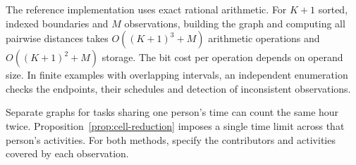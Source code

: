 The reference implementation uses exact rational arithmetic. For $K+1$ sorted, indexed boundaries and $M$ observations, building the graph and computing all pairwise distances takes $O((K+1)^3+M)$ arithmetic operations and $O((K+1)^2+M)$ storage. The bit cost per operation depends on operand size. In finite examples with overlapping intervals, an independent enumeration checks the endpoints, their schedules and detection of inconsistent observations.

Separate graphs for tasks sharing one person's time can count the same hour twice. Proposition~\ref{prop:cell-reduction} imposes a single time limit across that person's activities. For both methods, specify the contributors and activities covered by each observation.
